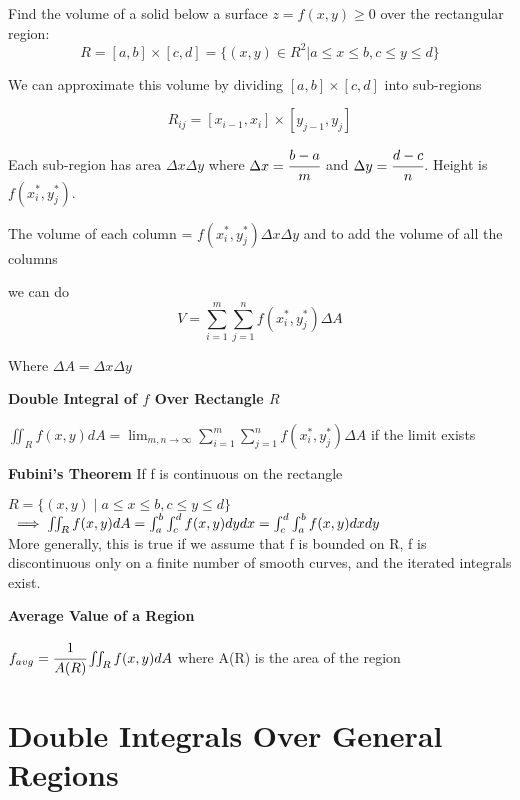 \documentclass{article}
\begin{document}
Find the volume of a solid below a surface $z=f(x, y) \geq 0$ over the rectangular region:
$$R = [a, b] \times [c, d] = \{ (x, y) \in R^2 | a \leq x \leq b, c \leq y \leq d \}$$

We can approximate this volume by dividing $[a,b] \times [c,d]$ into sub-regions 

$$R_{ij} = [x_{i-1}, x_{i}] \times [y_{j-1}, y_j]$$

Each sub-region has area $\Delta x \Delta y$ where $\Delta x = \cfrac{b-a}{m}$ and $\Delta y = \cfrac{d - c}{n}$. 
Height is $f(x_i^*, y_j^*)$.

The volume of each column = $f(x_i^*, y_j^*)\Delta x \Delta y$ and to add the volume of all the columns

we can do 
$$V = \sum_{i=1}^m \sum_{j=1}^n f(x_i^*, y_j^*) \Delta A$$

Where $\Delta A = \Delta x \Delta y$

\begin{definition}
    \textbf{Double Integral of $f$ Over Rectangle $R$}

    $\iint_{R} f(x, y) dA = \lim_{m,n\to\infty} \sum_{i =1}^m \sum_{j=1}^n f(x_i^*, y_j^*) \Delta A$
    if the limit exists
\end{definition}

\begin{theorem}
    \textbf{Fubini's Theorem}
    If f is continuous on the rectangle 
    
    $R = \{(x, y) \mid a \leq x \leq b, c \leq y \leq d \}$
    $\\ \implies\iint_R f(x, y) dA = \int_a^b \int_c^d f(x, y) dydx = \int_c^d \int_a^b f(x, y) dxdy$\\
    
    More generally, this is true if we assume that f is bounded on R, f is discontinuous only on a finite number of smooth curves, and the iterated integrals exist.
\end{theorem}

\newpage

\begin{definition}
    \textbf{Average Value of a Region}

    $f_{avg} = \cfrac{1}{A(R)} \iint_R f(x, y) dA$
    where A(R) is the area of the region
\end{definition}
\section{Double Integrals Over General Regions}
\end{document}
